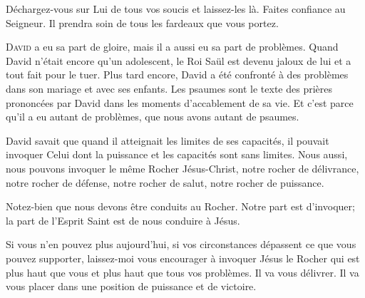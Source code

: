 Déchargez-vous sur Lui de tous vos soucis et laissez-les là.
 Faites confiance au Seigneur.
 Il prendra soin de tous les fardeaux que vous portez. 

\dvrule






\lettrine{D}{avid} a eu sa part de gloire,
 mais il a aussi eu sa part de problèmes.
 Quand David n'était encore qu'un adolescent,
 le Roi Saül est devenu jaloux de lui et a tout fait pour le tuer.
 Plus tard encore, David a été confronté à des problèmes dans son mariage
 et avec ses enfants. Les psaumes sont le texte des prières prononcées
 par David dans les moments d'accablement de sa vie.
 Et c'est parce qu'il a eu autant de problèmes,
 que nous avons autant de psaumes.


David savait que quand il atteignait les limites de ses capacités,
 il pouvait invoquer Celui dont la puissance et les capacités sont sans limites.
 Nous aussi, nous pouvons invoquer le même Rocher \ocadr Jésus-Christ,
 notre rocher de délivrance, notre rocher de défense, notre rocher de salut,
 notre rocher de puissance.

Notez-bien que nous devons être conduits au Rocher.
 Notre part est d'invoquer; la part de l'Esprit Saint 
 est de nous conduire à Jésus.

Si vous n'en pouvez plus aujourd'hui, si vos circonstances dépassent
 ce que vous pouvez supporter, laissez-moi vous encourager à invoquer Jésus
 \ocadr le Rocher qui est plus haut que vous et plus haut
 que tous vos problèmes.
 Il va vous délivrer. Il va vous placer dans une position de puissance
 et de victoire. 

\dvrule



